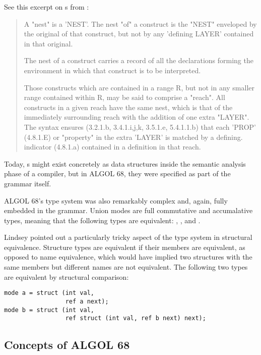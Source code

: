 See this excerpt on s from
\cite[Section 3.0.2, Semantics]{revised_report_on_the_algorithmic_language_algol_68_1976}:
\begin{quotation}
	A "nest" is a 'NEST'. The nest "of" a construct is the "NEST" enveloped
	by the original of that construct, but not by any 'defining LAYER'
	contained in that original.

		{The nest of a construct carries a record of all the declarations forming
			the environment in which that construct is to be interpreted.

			Those constructs which are contained in a range R, but not in any
			smaller range contained within R, may be said to comprise a "reach". All
			constructs in a given reach have the same nest, which is that of the
			immediately surrounding reach with the addition of one extra "LAYER".
			The syntax ensures (3.2.1.b, 3.4.1.i,j,k, 3.5.1.e, 5.4.1.1.b) that each 'PROP'
			(4.8.1.E) or "property" in the extra 'LAYER' is matched by a defining.
			indicator (4.8.1.a) contained in a definition in that reach.}
\end{quotation}

Today, s might exist concretely as data structures inside the semantic analysis
phase of a compiler, but in ALGOL 68, they were specified as part of the grammar itself.

ALGOL 68's type system was also remarkably complex and, again, fully embedded in the grammar.
Union modes are full commutative and accumalative types, meaning that
the following types are equivalent:
,
, and
.

Lindsey pointed out a particularly tricky aspect of the type system in structural equivalence.
Structure types are equivalent if their members are equivalent, as opposed to name equivalence,
which would have implied two structures with the same members but different names
are not equivalent.
The following two types are equivalent by structural comparison:
\begin{lstlisting}[language=algol,frame=single]
mode a = struct (int val,
                 ref a next);
mode b = struct (int val,
                 ref struct (int val, ref b next) next);
\end{lstlisting}


\subsection{Concepts of ALGOL 68}

